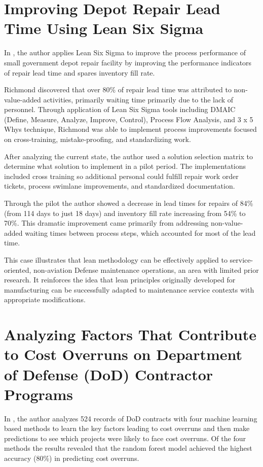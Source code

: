 \documentclass{article}
\begin{document}
		
		\section{Improving Depot Repair Lead Time Using Lean Six Sigma \cite{Richmond2023}}

			In \cite{Richmond2023}, the author applies Lean Six Sigma to improve the process performance of small government depot repair facility by improving the performance indicators of repair lead time and spares inventory fill rate.

			Richmond discovered that over 80\% of repair lead time was attributed to non-value-added activities, primarily waiting time primarily due to the lack of personnel.
			Through application of Lean Six Sigma tools including DMAIC (Define, Measure, Analyze, Improve, Control), Process Flow Analysis, and 3 x 5 Whys technique, Richmond was able to implement process improvements focused on cross-training, mistake-proofing, and standardizing work.

			After analyzing the current state, the author used a solution selection matrix to determine what solution to implement in a pilot period.
			The implementations included cross training so additional personal could fulfill repair work order tickets, process swimlane improvements, and standardized documentation.
 
			Through the pilot the author showed a decrease in lead times for repairs of 84\% (from 114 days to just 18 days) and inventory fill rate increasing from 54\% to 70\%. 
			This dramatic improvement came primarily from addressing non-value-added waiting times between process steps, which accounted for most of the lead time.

			This case illustrates that lean methodology can be effectively applied to service-oriented, non-aviation Defense maintenance operations, an area with limited prior research. 
			It reinforces the idea that lean principles originally developed for manufacturing can be successfully adapted to maintenance service contexts with appropriate modifications.


		\section{Analyzing Factors That Contribute to Cost Overruns on Department of Defense (DoD) Contractor Programs \cite{FunchesAllen2025}}

			In \cite{FunchesAllen2025}, the author analyzes 524 records of DoD contracts with four machine learning based methods to learn the key factors leading to cost overruns and then make predictions to see which projects were likely to face cost overruns.
			Of the four methods the results revealed that the random forest model achieved the highest accuracy (80\%) in predicting cost overruns. 
\end{document}
